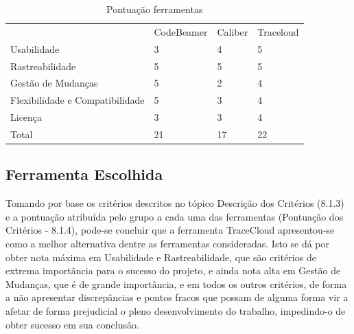 \begin{table}[\htp]
\centering
\caption{Pontuação ferramentas}
\label{my-label}
\begin{tabular}{llll}
 & CodeBeamer & Caliber & Traceloud \\
Usabilidade & 3 & 4 & 5 \\
Rastreabilidade & 5 & 5 & 5 \\
Gestão de Mudanças & 5 & 2 & 4 \\
Flexibilidade e Compatibilidade & 5 & 3 & 4 \\
Licença & 3 & 3 & 4 \\
Total & 21 & 17 & 22
\end{tabular}
\end{table}


\subsection{Ferramenta Escolhida}

Tomando por base os critérios descritos no tópico Descrição dos Critérios (8.1.3) e a pontuação atribuída pelo grupo a cada uma das ferramentas (Pontuação dos Critérios - 8.1.4), pode-se concluir que a ferramenta TraceCloud apresentou-se como a melhor alternativa dentre as ferramentas consideradas. Isto se dá por obter nota máxima em Usabilidade e Rastreabilidade, que são critérios de extrema importância para o sucesso do projeto, e ainda nota alta em Gestão de Mudanças, que é de grande importância, e em todos os outros critérios, de forma a não apresentar discrepâncias e pontos fracos que possam de alguma forma vir a afetar de forma prejudicial o pleno desenvolvimento do trabalho, impedindo-o de obter sucesso em sua conclusão.
